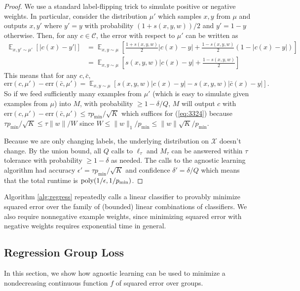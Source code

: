 \documentclass[final, 12pt]{colt2018} %
\newcommand{\eps}{\epsilon}
\newcommand{\E}{\mathop{\mathbb{E}}}
\newcommand{\err}{\mathrm{err}}
\newcommand{\pmin}{p_{\text{min}}}
\def\calC{\mathcal{C}}
\def\calX{\mathcal{X}}
\def\calZ{\mathcal{Z}}
\def\norm#1{\mathopen\| #1 \mathclose\|}%
\newcommand{\poly}{\mathop{\mbox{\text{poly}}}}
\begin{document}
\begin{proof}
We use a standard label-flipping trick to simulate positive or negative weights. In particular, consider the distribution $\mu'$ which samples $x,y$ from $\mu$ and outputs $x,y'$ where $y'=y$ with probability $(1+s(x,y,w))/2$ and $y'=1-y$ otherwise. Then, for any $c\in \calC$, the error with respect to $\mu'$ can be written as
\begin{align*}
\E_{x,y' \sim \mu'}[|c(x)-y'|] &= \E_{x,y \sim \mu}\left[\frac{1+s(x,y,w)}{2}|c(x)-y|+\frac{1-s(x,y,w)}{2}(1-|c(x)-y|)\right] \\
&= \E_{x,y \sim \mu}\left[s(x,y,w)|c(x)-y|+\frac{1-s(x,y,w)}{2}\right] 
\end{align*}
This means that for any $c,\bar{c}$,
$$\err(c, \mu')-\err({\bar{c}}, \mu') = \E_{x,y\sim \mu}[s(x,y,w) |c(x)-y|-s(x,y,w) |\bar{c}(x)-y|].$$
So if we feed sufficiently many examples from $\mu'$ (which is easy to simulate given examples from $\mu$) into $M$, with probability $\geq 1-\delta/Q$, $M$ will output $c$ with $\err(c, \mu')-\err({\bar{c}}, \mu')\leq \tau \pmin/\sqrt{K}$ which suffices for (\ref{eq:3324}) because $\tau \pmin/\sqrt{K}\leq \tau\norm{w}/W$ since $W\leq \norm{w}_1/\pmin \leq \norm{w}\sqrt{K}/\pmin$.

Because we are only changing labels, the underlying distribution on $\calX$ doesn't change. By the union bound, all $Q$ calls to $\ell_\tau$ and $M_\tau$ can be answered within $\tau$ tolerance with probability $\geq 1-\delta$ as needed. The calls to the agnostic learning algorithm had accuracy $\eps'=\tau\pmin /\sqrt{K}$ and confidence $\delta'=\delta/Q$ which means that the total runtime is $\poly(1/\eps, 1/\pmin)$.
\end{proof}



Algorithm \ref{alg:regress} repeatedly calls a linear classifier to provably minimize squared error over the family of (bounded) linear combinations of classifiers. We also require nonnegative example weights, since minimizing squared error with negative weights requires exponential time in general.

\subsection{Regression Group Loss}\label{sec:regression-reduction}
In this section, we show how agnostic learning can be used to minimize a nondecreasing continuous function $f$ of squared error over groups.  
\end{document}
